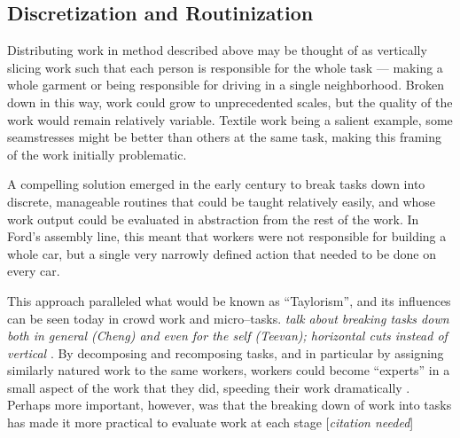 \documentclass{sigchi}
\begin{document}







\subsection{Discretization and Routinization}

Distributing work in method described above may be thought of as vertically slicing work such that 
each person is responsible for the whole task
--- making a whole garment or being responsible for driving in a single neighborhood.
Broken down in this way, work could grow to unprecedented scales,
but the quality of the work would remain relatively variable.
Textile work being a salient example,
some seamstresses might be better than others at the same task,
making this framing of the work initially problematic.

A compelling solution emerged in the early  century to break tasks down into discrete,
manageable routines that could be taught relatively easily,
and whose work output could be evaluated in abstraction from the rest of the work.
In Ford's assembly line, this meant that workers were not responsible for building a whole car,
but a single very narrowly defined action that needed to be done on every car.

This approach paralleled what would be known as ``Taylorism'',
and its influences can be seen today in crowd work and micro--tasks.
\textit{talk about breaking tasks down both in general (Cheng) and even for the self (Teevan);
horizontal cuts instead of vertical}
\cite{cheng2015break,writingMicroTasks}.
By decomposing and recomposing tasks,
and in particular by assigning similarly natured work to the same workers,
workers could become ``experts'' in a small aspect of the work that they did,
speeding their work dramatically
\cite{delayAndOrderLasecki}.
Perhaps more important, however, was that
the breaking down of work into tasks has made it more practical to evaluate work at each stage
[\textit{citation needed}]
\end{document}
